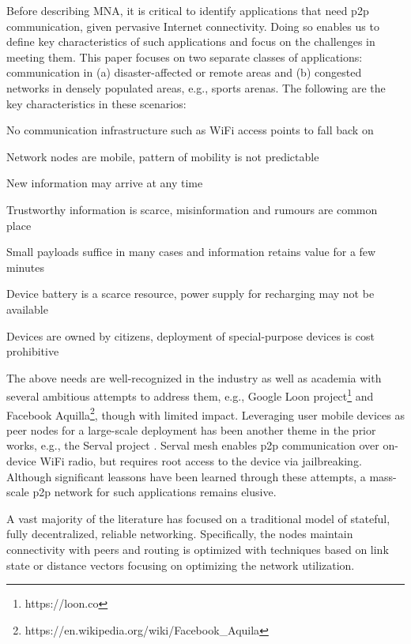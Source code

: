 \documentclass[conference]{IEEEtran}
\newcommand{\taskprefix}{CH}
\newcommand{\tasksize}{\normalsize}
\newenvironment{taskenv}[1]{\begin{list}{{\tasksize\sc \theenumi.}}{\usecounter{enumi}
      \settowidth{\labelwidth}{{\tasksize\sc \taskprefix#1-99}}
      \setlength{\leftmargin}{\labelwidth}
}}{\end{list}}
\newcounter{task}
\newcommand{\btask}{\begin{taskenv}{\taskprefix}\setcounter{enumi}{\value{task}}\renewcommand{\theenumi}{\taskprefix$_{\arabic{enumi}}$}}
\newcommand{\etask}{\setcounter{task}{\value{enumi}}\renewcommand{\theenumi}{\arabic{enumi}.}\end{taskenv}}
\begin{document}
Before describing MNA, it is critical to identify applications that
need p2p communication, given pervasive Internet connectivity. Doing
so enables us to define key characteristics of such applications and
focus on the challenges in meeting them.  This paper focuses on two
separate classes of applications: communication in
(a) disaster-affected or remote areas and (b) congested networks in
densely populated areas, e.g., sports arenas.  The following are the
key characteristics in these scenarios:

%
\btask
%
\item\label{c:0} No communication infrastructure such as WiFi
  access points to fall back on
\item\label{c:1} Network nodes are mobile, pattern of mobility is not
  predictable
\item\label{c:2} New information may arrive at any time
\item\label{c:3} Trustworthy information is scarce, misinformation and
  rumours are common place
\item\label{c:4}  Small payloads suffice in many cases and information
  retains value for a few minutes
\item\label{c:5}  Device battery is a scarce resource, power supply
  for recharging may not be available
\item\label{c:6}  Devices are owned by citizens, deployment of
  special-purpose devices is cost prohibitive
%
\etask
%

The above needs are well-recognized in the industry as well as
academia with several ambitious attempts to address them, e.g., Google
Loon project\footnote{https://loon.co} and Facebook
Aquilla\footnote{https://en.wikipedia.org/wiki/Facebook\_Aquila},
though with limited impact. Leveraging user mobile devices as peer
nodes for a large-scale deployment has been another theme in the prior
works, e.g., the Serval project
\cite{gardner-stephen-serval-2011}. Serval mesh enables p2p
communication over on-device WiFi radio, but requires root access to
the device via jailbreaking. Although significant leassons have been
learned through these attempts, a mass-scale p2p network for such
applications remains elusive.

A vast majority of the literature has focused on a traditional model
of stateful, fully decentralized, reliable networking. Specifically,
the nodes maintain connectivity with peers and routing is optimized
with techniques based on link state or distance vectors
\cite{clausen-olsr-2003,perkins-aodv-2003} focusing on optimizing the
network utilization.
\end{document}
